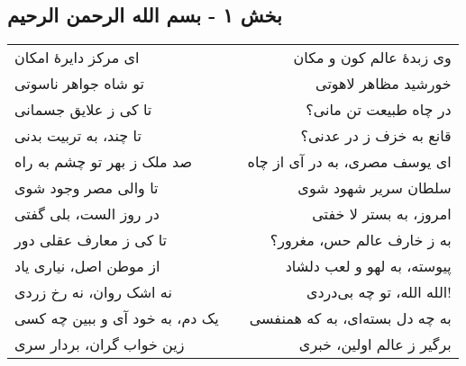 \begin{center}
\section*{بخش ۱ - بسم الله الرحمن الرحیم}
\label{sec:001}
\begin{longtable}{l p{0.5cm} r}
ای مرکز دایرهٔ امکان
&&
وی زبدهٔ عالم کون و مکان
\\
تو شاه جواهر ناسوتی
&&
خورشید مظاهر لاهوتی
\\
تا کی ز علایق جسمانی
&&
در چاه طبیعت تن مانی؟
\\
تا چند، به تربیت بدنی
&&
قانع به خزف ز در عدنی؟
\\
صد ملک ز بهر تو چشم به راه
&&
ای یوسف مصری، به در آی از چاه
\\
تا والی مصر وجود شوی
&&
سلطان سریر شهود شوی
\\
در روز الست، بلی گفتی
&&
امروز، به بستر لا خفتی
\\
تا کی ز معارف عقلی دور
&&
به ز خارف عالم حس، مغرور؟
\\
از موطن اصل، نیاری یاد
&&
پیوسته، به لهو و لعب دلشاد
\\
نه اشک روان، نه رخ زردی
&&
الله الله، تو چه بی‌دردی!
\\
یک دم، به خود آی و ببین چه کسی
&&
به چه دل بسته‌ای، به که همنفسی
\\
زین خواب گران، بردار سری
&&
برگیر ز عالم اولین، خبری
\\
\end{longtable}
\end{center}
